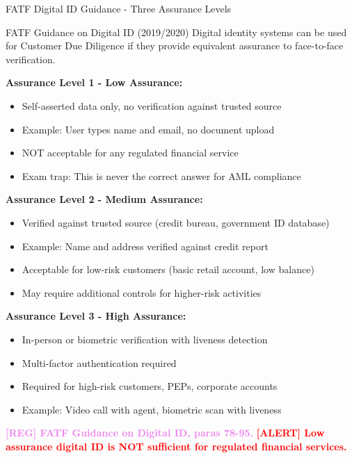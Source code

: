 \documentclass[11pt,a4paper]{beamer}
\newcommand{\redflag}[1]{\textcolor{red}{\textbf{[ALERT] #1}}}
\newcommand{\regcite}[1]{\textcolor{violet}{\textbf{[REG] #1}}}
\begin{document}
	\begin{frame}{FATF Digital ID Guidance - Three Assurance Levels}
		\begin{block}{FATF Guidance on Digital ID (2019/2020)}
			Digital identity systems can be used for Customer Due Diligence if they provide equivalent assurance to face-to-face verification.
		\end{block}
		
		\textbf{Assurance Level 1 - Low Assurance:}
		\begin{itemize}
			\item Self-asserted data only, no verification against trusted source
			\item Example: User types name and email, no document upload
			\item NOT acceptable for any regulated financial service
			\item Exam trap: This is never the correct answer for AML compliance
		\end{itemize}
		
		\textbf{Assurance Level 2 - Medium Assurance:}
		\begin{itemize}
			\item Verified against trusted source (credit bureau, government ID database)
			\item Example: Name and address verified against credit report
			\item Acceptable for low-risk customers (basic retail account, low balance)
			\item May require additional controls for higher-risk activities
		\end{itemize}
		
		\textbf{Assurance Level 3 - High Assurance:}
		\begin{itemize}
			\item In-person or biometric verification with liveness detection
			\item Multi-factor authentication required
			\item Required for high-risk customers, PEPs, corporate accounts
			\item Example: Video call with agent, biometric scan with liveness
		\end{itemize}
		
		\regcite{FATF Guidance on Digital ID, paras 78-95.}
		\redflag{Low assurance digital ID is NOT sufficient for regulated financial services.}
	\end{frame}
	
\end{document}
